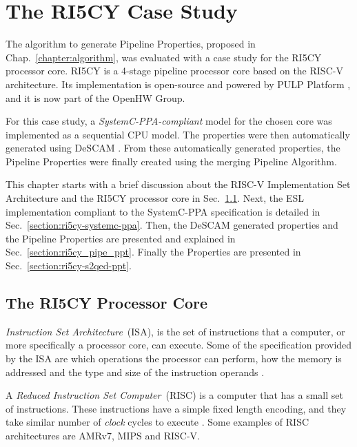 \chapter{The RI5CY Case Study}
\label{chapter:ri5cy}

The algorithm to generate Pipeline Properties, proposed in Chap.~\ref{chapter:algorithm},  was evaluated with a case study for the RI5CY processor core. RI5CY is a 4-stage pipeline processor core based on the RISC-V architecture. Its implementation is open-source and powered by PULP Platform \cite{pulp}, and it is now part of  the OpenHW Group\cite{openhw}.

For this case study, a \textit{SystemC-PPA-compliant} \cite{paper-pdd} model for the chosen core was implemented as a sequential CPU model. The properties were then automatically generated using DeSCAM \cite{descam}. From these automatically generated properties, the Pipeline Properties were finally created using the merging Pipeline Algorithm. 

This chapter starts with a brief discussion about the RISC-V Implementation Set Architecture and the RI5CY processor core in Sec.~\ref{section:ri5cy_core}. Next, the ESL implementation compliant to the SystemC-PPA specification is detailed in Sec.~\ref{section:ri5cy-systemc-ppa}. Then, the DeSCAM generated properties and the Pipeline Properties are presented and explained in Sec.~\ref{section:ri5cy_pipe_ppt}. Finally the \SSQED{} Properties are presented in Sec.~\ref{section:ri5cy-s2qed-ppt}.

\section{The RI5CY Processor Core}
\label{section:ri5cy_core}

\textit{Instruction Set Architecture}~(ISA), is the set of instructions that a computer, or more specifically a processor core, can execute. Some of the specification provided by the ISA are which operations the processor can perform, how the memory is addressed and the type and size of the instruction operands \cite{book-comp-arch}.

A \textit{Reduced Instruction Set Computer}~(RISC) is a computer that has a small set of instructions. These instructions have a simple fixed length encoding, and they take similar number of \textit{clock} cycles to execute \cite{book-comp-arch}. Some examples of RISC architectures are AMRv7, MIPS and RISC-V.

